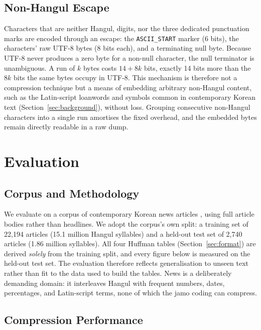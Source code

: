 \documentclass[conference]{IEEEtran}
\begin{document}
\subsection{Non-Hangul Escape}

Characters that are neither Hangul, digits, nor the three dedicated punctuation
marks are encoded through an escape: the \texttt{ASCII\_START} marker (6 bits),
the characters' raw UTF-8 bytes (8 bits each), and a terminating null byte.
Because UTF-8 never produces a zero byte for a non-null character, the null
terminator is unambiguous. A run of $k$ bytes costs $14 + 8k$ bits, exactly 14
bits more than the $8k$ bits the same bytes occupy in UTF-8. This mechanism is
therefore not a compression technique but a means of embedding arbitrary
non-Hangul content, such as the Latin-script loanwords and symbols common in
contemporary Korean text (Section~\ref{sec:background}), without loss. Grouping
consecutive non-Hangul characters into a single run amortises the fixed
overhead, and the embedded bytes remain directly readable in a raw dump.

\section{Evaluation}
\label{sec:evaluation}

\subsection{Corpus and Methodology}

We evaluate on a corpus of contemporary Korean news articles \cite{navernews},
using full article bodies rather than headlines. We adopt the corpus's own
split: a training set of 22{,}194 articles (15.1 million Hangul syllables) and a
held-out test set of 2{,}740 articles (1.86 million syllables). All four Huffman
tables (Section~\ref{sec:format}) are derived \emph{solely} from the training
split, and every figure below is measured on the held-out test set. The
evaluation therefore reflects generalisation to unseen text rather than fit to
the data used to build the tables. News is a deliberately demanding domain: it
interleaves Hangul with frequent numbers, dates, percentages, and Latin-script
terms, none of which the jamo coding can compress.

\subsection{Compression Performance}
\end{document}

